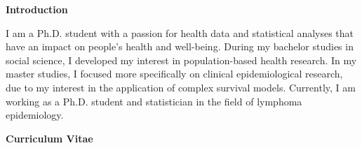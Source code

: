 \documentclass[11pt, a4paper]{article}
\begin{document}
	
	\begin{center}
		\textbf{Introduction}
	\end{center}
	
	\noindent I am a Ph.D. student with a passion for health data and statistical analyses that have an impact on people's health and well-being. During my bachelor studies in social science, I developed my interest in population-based health research. In my master studies, I focused more specifically on clinical epidemiological research, due to my interest in the application of complex survival models. Currently, I am working as a Ph.D. student and statistician in the field of lymphoma epidemiology.
	
	\begin{center}
		\textbf{Curriculum Vitae}
	\end{center}
	
\end{document}

